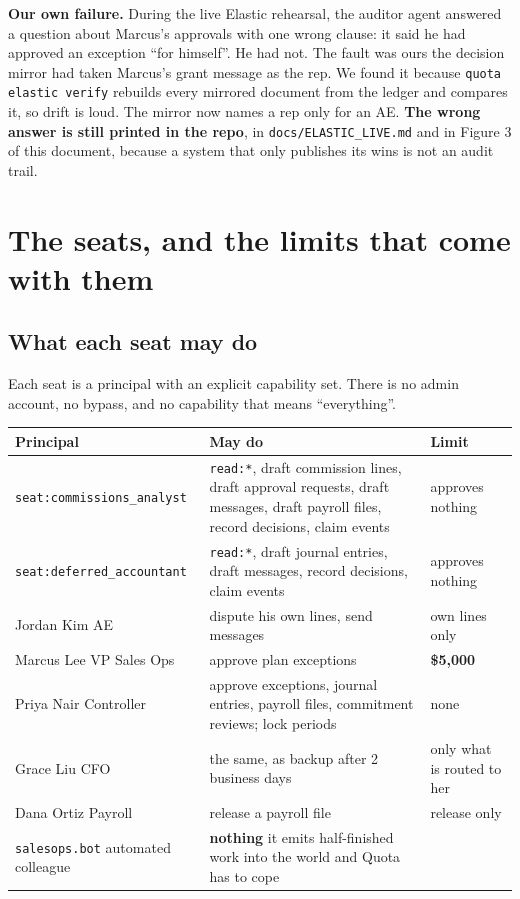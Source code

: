\documentclass[10pt,a4paper]{article}
\newcommand{\gy}[1]{{\color{qgrey}#1}}
\newcommand{\code}[1]{{\small\texttt{#1}}}
\begin{document}
\textbf{Our own failure.} During the live Elastic rehearsal, the auditor agent answered a question about Marcus's approvals with one wrong clause: it said he had approved an exception ``for himself''. He had not. The fault was ours \textemdash{} the decision mirror had taken Marcus's grant message as the rep. We found it because \code{quota elastic verify} rebuilds every mirrored document from the ledger and compares it, so drift is loud. The mirror now names a rep only for an AE. \textbf{The wrong answer is still printed in the repo}, in \code{docs/ELASTIC\_LIVE.md} and in Figure 3 of this document, because a system that only publishes its wins is not an audit trail.

\section{The seats, and the limits that come with them}

\subsection{What each seat may do}

Each seat is a principal with an explicit capability set. There is no admin account, no bypass, and no capability that means ``everything''.

\renewcommand{\arraystretch}{1.2}
\begin{tabularx}{\textwidth}{@{}p{42mm}X p{30mm}@{}}
\toprule
\textbf{Principal} & \textbf{May do} & \textbf{Limit}\\
\midrule
\code{seat:commissions\_analyst} & \code{read:*}, draft commission lines, draft approval requests, draft messages, draft payroll files, record decisions, claim events & \gy{approves nothing}\\
\code{seat:deferred\_accountant} & \code{read:*}, draft journal entries, draft messages, record decisions, claim events & \gy{approves nothing}\\
\midrule
Jordan Kim \gy{AE} & dispute his own lines, send messages & \gy{own lines only}\\
Marcus Lee \gy{VP Sales Ops} & approve plan exceptions & \textbf{\$5{,}000}\\
Priya Nair \gy{Controller} & approve exceptions, journal entries, payroll files, commitment reviews; lock periods & \gy{none}\\
Grace Liu \gy{CFO} & the same, as backup after 2 business days & \gy{only what is routed to her}\\
Dana Ortiz \gy{Payroll} & release a payroll file & \gy{release only}\\
\code{salesops.bot} \gy{automated colleague} & \textbf{nothing} \gy{\textemdash{} it emits half-finished work into the world and Quota has to cope} & \gy{\textemdash}\\
\bottomrule
\end{tabularx}
\end{document}
